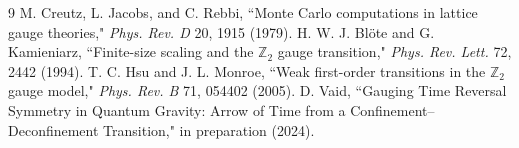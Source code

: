 \documentclass{article}
\begin{document}
\begin{thebibliography}{9}
 M. Creutz, L. Jacobs, and C. Rebbi, ``Monte Carlo computations in lattice gauge theories," \textit{Phys. Rev. D} 20, 1915 (1979).
 H. W. J. Bl\"{o}te and G. Kamieniarz, ``Finite-size scaling and the $\mathbb{Z}_2$ gauge transition," \textit{Phys. Rev. Lett.} 72, 2442 (1994).
 T. C. Hsu and J. L. Monroe, ``Weak first-order transitions in the $\mathbb{Z}_2$ gauge model," \textit{Phys. Rev. B} 71, 054402 (2005).
 D. Vaid, ``Gauging Time Reversal Symmetry in Quantum Gravity: Arrow of Time from a Confinement--Deconfinement Transition," in preparation (2024).
\end{thebibliography}
\end{document}
